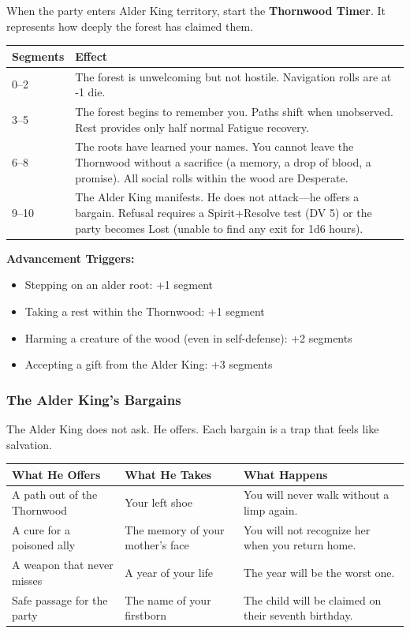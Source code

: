 \documentclass[11pt]{article}
\begin{document}
When the party enters Alder King territory, start the \textbf{Thornwood Timer}. It represents how deeply the forest has claimed them.

\begin{center}
\begin{longtable}{|p{3cm}|p{10cm}|}
\hline
\rowcolor{tableheader}
\textbf{Segments} & \textbf{Effect} \\
\hline
0--2 & The forest is unwelcoming but not hostile. Navigation rolls are at -1 die. \\
\hline
3--5 & The forest begins to remember you. Paths shift when unobserved. Rest provides only half normal Fatigue recovery. \\
\hline
6--8 & The roots have learned your names. You cannot leave the Thornwood without a sacrifice (a memory, a drop of blood, a promise). All social rolls within the wood are Desperate. \\
\hline
9--10 & The Alder King manifests. He does not attack---he offers a bargain. Refusal requires a Spirit+Resolve test (DV 5) or the party becomes Lost (unable to find any exit for 1d6 hours). \\
\hline
\end{longtable}
\end{center}

\textbf{Advancement Triggers:}
\begin{itemize}
\item Stepping on an alder root: +1 segment
\item Taking a rest within the Thornwood: +1 segment
\item Harming a creature of the wood (even in self-defense): +2 segments
\item Accepting a gift from the Alder King: +3 segments
\end{itemize}

\subsubsection{The Alder King's Bargains}

The Alder King does not ask. He offers. Each bargain is a trap that feels like salvation.

\begin{center}
\begin{longtable}{|p{4cm}|p{4cm}|p{4cm}|}
\hline
\rowcolor{tableheader}
\textbf{What He Offers} & \textbf{What He Takes} & \textbf{What Happens} \\
\hline
A path out of the Thornwood & Your left shoe & You will never walk without a limp again. \\
\hline
A cure for a poisoned ally & The memory of your mother's face & You will not recognize her when you return home. \\
\hline
A weapon that never misses & A year of your life & The year will be the worst one. \\
\hline
Safe passage for the party & The name of your firstborn & The child will be claimed on their seventh birthday. \\
\hline
\end{longtable}
\end{center}
\end{document}
